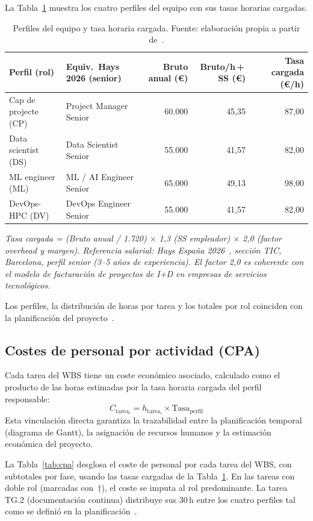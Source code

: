 La Tabla~\ref{tab:costes-rol} muestra los cuatro perfiles del equipo con sus tasas horarias cargadas.

\begin{table}[H]
\centering
\caption{Perfiles del equipo y tasa horaria cargada. Fuente: elaboración propia a partir de~\cite{hays2026}.}
\label{tab:costes-rol}
\footnotesize
\begin{tabular}{l l r r r}
\toprule
\textbf{Perfil (rol)} & \textbf{Equiv.\ Hays 2026 (senior)} & \textbf{Bruto anual (\euro{})} & \textbf{Bruto/h\,+\,SS (\euro{})} & \textbf{Tasa cargada (\euro{}/h)} \\
\midrule
Cap de projecte (CP)   & Project Manager Senior  & 60.000 & 45,35 & 87,00 \\
Data scientist (DS)    & Data Scientist Senior   & 55.000 & 41,57 & 82,00 \\
ML engineer (ML)       & ML / AI Engineer Senior & 65.000 & 49,13 & 98,00 \\
DevOps-HPC (DV)        & DevOps Engineer Senior  & 55.000 & 41,57 & 82,00 \\
\bottomrule
\end{tabular}
\end{table}

\noindent\textit{\scriptsize Tasa cargada = (Bruto anual / 1.720) $\times$ 1,3 (SS empleador) $\times$ 2,0 (factor overhead y margen). Referencia salarial: Hays España 2026~\cite{hays2026}, sección TIC, Barcelona, perfil senior (3--5 años de experiencia). El factor 2,0 es coherente con el modelo de facturación de proyectos de I+D en empresas de servicios tecnológicos.}

\noindent Los perfiles, la distribución de horas por tarea y los totales por rol coinciden con la planificación del proyecto~\cite{gep23e2}.

\subsection{Costes de personal por actividad (CPA)}

Cada tarea del WBS tiene un coste económico asociado, calculado como el producto de las horas estimadas por la tasa horaria cargada del perfil responsable:
\[
C_{\text{tarea}_i} = h_{\text{tarea}_i} \times \text{Tasa}_{\text{perfil}}
\]
Esta vinculación directa garantiza la trazabilidad entre la planificación temporal (diagrama de Gantt), la asignación de recursos humanos y la estimación económica del proyecto.

La Tabla~\ref{tab:cpa} desglosa el coste de personal por cada tarea del WBS, con subtotales por fase, usando las tasas cargadas de la Tabla~\ref{tab:costes-rol}. En las tareas con doble rol (marcadas con~$\dagger$), el coste se imputa al rol predominante. La tarea TG.2 (documentación continua) distribuye sus 30\,h entre los cuatro perfiles tal como se definió en la planificación~\cite{gep23e2}.

